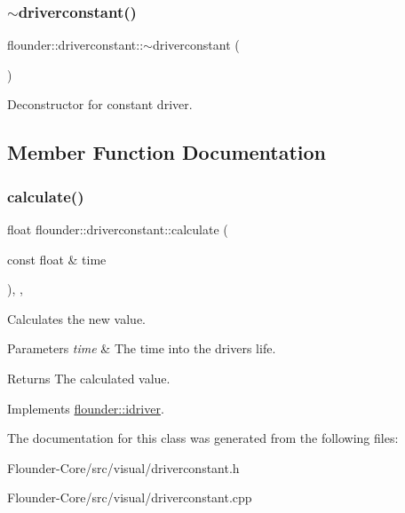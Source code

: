 \subsubsection{\texorpdfstring{$\sim$driverconstant()}{~driverconstant()}}
{\footnotesize\ttfamily flounder\+::driverconstant\+::$\sim$driverconstant (\begin{DoxyParamCaption}{ }\end{DoxyParamCaption})}



Deconstructor for constant driver. 



\subsection{Member Function Documentation}
\mbox{\label{classflounder_1_1driverconstant_acf786b61ab46ea1ebf8d9a802c33c441}} 
\subsubsection{\texorpdfstring{calculate()}{calculate()}}
{\footnotesize\ttfamily float flounder\+::driverconstant\+::calculate (\begin{DoxyParamCaption}\item[{const float \&}]{time }\end{DoxyParamCaption})\hspace{0.3cm}{\ttfamily [override]}, {\ttfamily [protected]}, {\ttfamily [virtual]}}



Calculates the new value. 


\begin{DoxyParams}{Parameters}
{\em time} & The time into the drivers life. \\
\hline
\end{DoxyParams}
\begin{DoxyReturn}{Returns}
The calculated value. 
\end{DoxyReturn}


Implements \hyperlink{classflounder_1_1idriver_a034c4159dc98c4c37ffdfaae64e4a16d}{flounder\+::idriver}.



The documentation for this class was generated from the following files\+:\begin{DoxyCompactItemize}
\item 
Flounder-\/\+Core/src/visual/driverconstant.\+h\item 
Flounder-\/\+Core/src/visual/driverconstant.\+cpp\end{DoxyCompactItemize}
